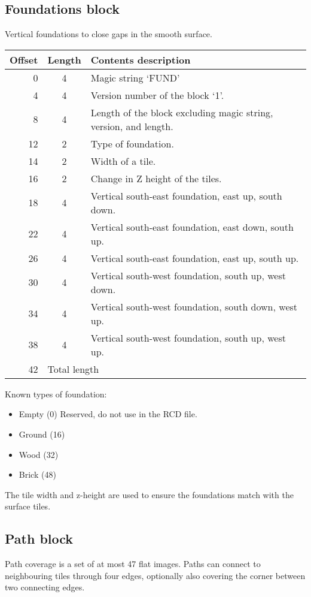 \documentclass{article}
\begin{document}
\subsection{Foundations block}
Vertical foundations to close gaps in the smooth surface.

\begin{center}
\begin{tabular}{|r|c|l|} \hline
\textbf{Offset} & \textbf{Length} & \textbf{Contents description} \\ \hline
  0 &  4 & Magic string `FUND' \\
  4 &  4 & Version number of the block `1'. \\
  8 &  4 & Length of the block excluding magic string, version, and length. \\
 12 &  2 & Type of foundation. \\
 14 &  2 & Width of a tile. \\
 16 &  2 & Change in Z height of the tiles. \\
 18 &  4 & Vertical south-east foundation, east up, south down. \\
 22 &  4 & Vertical south-east foundation, east down, south up. \\
 26 &  4 & Vertical south-east foundation, east up, south up. \\
 30 &  4 & Vertical south-west foundation, south up, west down. \\
 34 &  4 & Vertical south-west foundation, south down, west up. \\
 38 &  4 & Vertical south-west foundation, south up, west up. \\ \hline
 42 & \multicolumn{2}{l|}{Total length} \\ \hline
\end{tabular}
\end{center}

\medskip
\noindent
Known types of foundation:
\begin{itemize}
\item Empty (0) Reserved, do not use in the RCD{} file.
\item Ground (16)
\item Wood (32)
\item Brick (48)
\end{itemize}

The tile width and z-height are used to ensure the foundations match with the
surface tiles.

\subsection{Path block}
Path coverage is a set of at most 47 flat images. Paths can connect to
neighbouring tiles through four edges, optionally also covering the corner
between two connecting edges.
\end{document}
